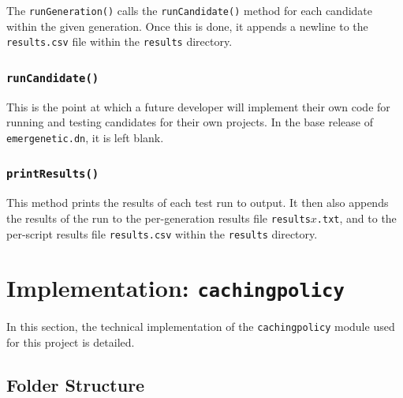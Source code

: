 \documentclass[compsoc,12pt,a4paper]{IEEEtran}
\begin{document}
				The \lstinline|runGeneration()| calls the \lstinline|runCandidate()| method for each candidate within the given generation. Once this is done, it appends a newline to the \lstinline|results.csv| file within the \lstinline|results| directory.
				
			\subsubsection{\lstinline|runCandidate()|}
			
				This is the point at which a future developer will implement their own code for running and testing candidates for their own projects. In the base release of \lstinline|emergenetic.dn|, it is left blank.
				
			\subsubsection{\lstinline|printResults()|}
			
				This method prints the results of each test run to output. It then also appends the results of the run to the per-generation results file \lstinline|results|$x$\lstinline|.txt|, and to the per-script results file \lstinline|results.csv| within the \lstinline|results| directory.
	
	\newpage
	
	\section{Implementation: \lstinline|cachingpolicy|}
	\label{sec:cachingpolicyimpl}
		
		In this section, the technical implementation of the \lstinline|cachingpolicy| module used for this project is detailed.
		
		\subsection{Folder Structure}
			
\end{document}
